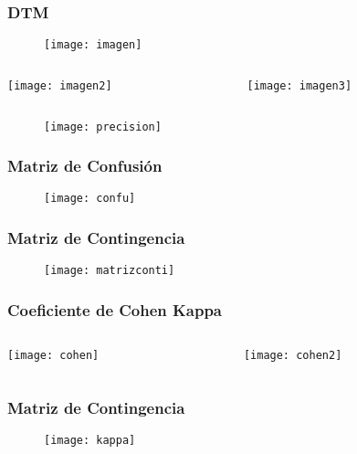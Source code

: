 \documentclass[14pt]{beamer}
\begin{document}
\begin{frame}
\frametitle{DTM}
  \begin{figure}
    \centering
    \texttt{[image: imagen]}
   \end{figure}
\begin{columns}
		\begin{column}{.49\linewidth}
		 \texttt{[image: imagen2]}
		\end{column}
		\begin{column}{.49\linewidth}
			 \texttt{[image: imagen3]}
		\end{column}
	\end{columns}
\end{frame}
\begin{frame}
  \begin{figure}
    \centering
    \texttt{[image: precision]}
  \end{figure}
\end{frame}
\begin{frame}
\frametitle{Matriz de Confusión}
  \begin{figure}
    \centering
    \texttt{[image: confu]}
  \end{figure}
\end{frame}
\begin{frame}
\frametitle{Matriz de Contingencia}
  \begin{figure}
    \centering
    \texttt{[image: matrizconti]}
  \end{figure}
\end{frame}
\begin{frame}
\frametitle{Coeficiente de Cohen Kappa}
\begin{columns}
		\begin{column}{.49\linewidth}
		 \texttt{[image: cohen]}
		\end{column}
		\begin{column}{.49\linewidth}
			 \texttt{[image: cohen2]}
		\end{column}
	\end{columns}
\end{frame}
\begin{frame}
\frametitle{Matriz de Contingencia}
  \begin{figure}
    \centering
    \texttt{[image: kappa]}
  \end{figure}
\tiny{}
\end{frame}
\end{document}
